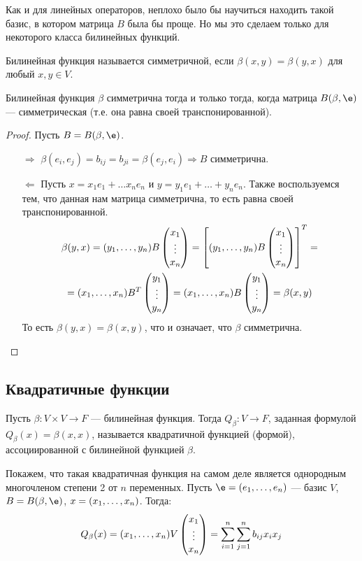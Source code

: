 Как и для линейных операторов, неплохо было бы научиться находить такой базис, в котором матрица $B$ была бы проще. Но мы это сделаем только для некоторого класса билинейных функций.

\begin{Def}
Билинейная функция называется симметричной, если $\beta(x, y) =\beta(y, x)$ для любый $x, y \in V$.
\end{Def}

\begin{Suggestion}
Билинейная функция $\beta$ симметрична тогда и только тогда, когда матрица $B(\beta, \e)$ --- симметрическая (т.е. она равна своей транспонированной).
\end{Suggestion}

\begin{proof}
Пусть $B = B(\beta, \e)$.
\begin{itemize}
\item[$\Rightarrow$] $\beta(e_i, e_j) = b_{ij} = b_{ji} = \beta(e_j, e_i) \Rightarrow B$ симметрична. 
\item[$\Leftarrow$] Пусть $x = x_1e_1 + \ldots x_ne_n$ и $y = y_1e_1 + \ldots + y_ne_n$. Также воспользуемся тем, что данная нам матрица симметрична, то есть равна своей транспонированной.
\begin{gather*}
\beta(y, x) = ({y}_1, \ldots, {y}_n)B\begin{pmatrix}{x}_1 \\\vdots\\{x}_n\end{pmatrix} = \left[({y}_1, \ldots, {y}_n)B\begin{pmatrix}{x}_1 \\\vdots\\{x}_n\end{pmatrix}\right]^T =\\
= ({x}_1, \ldots, {x}_n)B^T\begin{pmatrix}{y}_1 \\\vdots\\{y}_n\end{pmatrix} = ({x}_1, \ldots, {x}_n)B\begin{pmatrix}{y}_1 \\\vdots\\{y}_n\end{pmatrix} = \beta(x, y)
\end{gather*}
То есть $\beta(y, x) = \beta(x, y)$, что и означает, что $\beta$ симметрична.
\end{itemize}
\end{proof}

\subsection*{Квадратичные функции}

\begin{Def}
Пусть $\beta \colon V\times V \rightarrow F$ --- билинейная функция. Тогда $Q_\beta \colon V \rightarrow F$, заданная формулой $Q_\beta(x) = \beta(x, x)$, называется квадратичной функцией (формой), ассоциированной с билинейной функцией $\beta$.
\end{Def}

Покажем, что такая квадратичная функция на самом деле является однородным многочленом степени 2 от $n$ переменных. Пусть $\e = \vector{e}$ --- базис $V$, $B = B(\beta, \e)$, $x = ({x}_1, \ldots, {x}_n)$. Тогда:
$$
Q_\beta(x) = ({x}_1, \ldots, {x}_n)V\begin{pmatrix}{x}_1 \\\vdots\\{x}_n\end{pmatrix} = \sum_{i = 1}^{n}\sum_{j = 1}^{n}b_{ij}x_ix_j
$$

